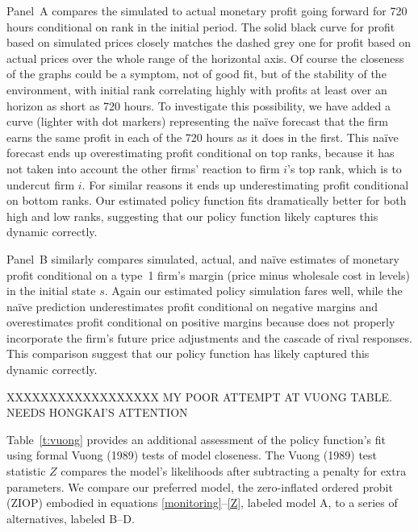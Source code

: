 \documentclass[11pt]{article}
\begin{document}
\begin{spacing}{1.3}
Panel~A compares the simulated to actual monetary profit going forward
for 720 hours conditional on rank in the initial period. The solid
black curve for profit based on simulated prices closely matches the
dashed grey one for profit based on actual prices over the whole range
of the horizontal axis. Of course the closeness of the graphs could be
a symptom, not of good fit, but of the stability of the environment,
with initial rank correlating highly with profits at least over an
horizon as short as 720 hours. To investigate this possibility, we
have added a curve (lighter with dot markers) representing the
na\"{i}ve forecast that the firm earns the same profit in each of the
720 hours as it does in the first. This na\"{i}ve forecast ends up
overestimating profit conditional on top ranks, because it has not
taken into account the other firms' reaction to firm $i$'s top rank,
which is to undercut firm $i$. For similar reasons it ends up
underestimating profit conditional on bottom ranks. Our estimated
policy function fits dramatically better for both high and low ranks,
suggesting that our policy function likely captures this dynamic
correctly.

Panel~B similarly compares simulated, actual, and na\"{i}ve estimates
of monetary profit conditional on a type~1 firm's margin (price minus
wholesale cost in levels) in the initial state $s$. Again our
estimated policy simulation fares well, while the na\"{i}ve prediction
underestimates profit conditional on negative margins and
overestimates profit conditional on positive margins because does not
properly incorporate the firm's future price adjustments and the
cascade of rival responses. This comparison suggest that our policy
function has likely captured this dynamic correctly.

XXXXXXXXXXXXXXXXXX MY POOR ATTEMPT AT VUONG TABLE. NEEDS HONGKAI'S ATTENTION

Table~\ref{t:vuong} provides an additional assessment of the policy
function's fit using formal Vuong (1989) tests of model closeness. The
Vuong (1989) test statistic $Z$ compares the model's likelihoods after
subtracting a penalty for extra parameters. We compare our preferred
model, the zero-inflated ordered probit (ZIOP) embodied in equations
\eqref{monitoring}--\eqref{Z}, labeled model A, to a series of
alternatives, labeled B--D.


\end{spacing}
\end{document}

